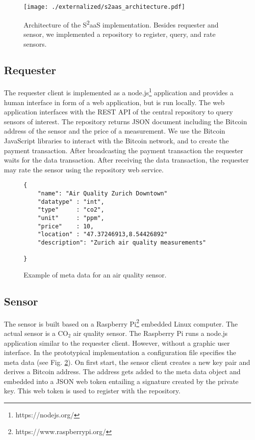 \begin{figure}
\centering
\texttt{[image: ./externalized/s2aas\_architecture.pdf]}
\caption{Architecture of the S\textsuperscript{2}aaS implementation. Besides requester and sensor, we implemented a repository to register, query, and rate sensors.}
\label{fig:s2aasImplementation}
\end{figure}



\subsection{Requester}

The requester client is implemented as a node.js\footnote{https://nodejs.org/} application and provides a human interface in form of a web application, but is run locally. The web application interfaces with the \ac{REST} \ac{API} of the central repository to query sensors of interest. The repository returns \ac{JSON} document including the Bitcoin address of the sensor and the price of a measurement. We use the Bitcoin JavaScript libraries to interact with the Bitcoin network, and to create the payment transaction. After broadcasting the payment transaction the requester waits for the data transaction. After receiving the data transaction, the requester may rate the sensor using the repository web service. 

\begin{figure}
\begin{lstlisting}[basicstyle=\ttfamily\small]
{     
    "name": "Air Quality Zurich Downtown"
    "datatype" : "int",
    "type"     : "co2",
    "unit"     : "ppm",
    "price"    : 10,
    "location" : "47.37246913,8.54426892"
    "description": "Zurich air quality measurements"

}
\end{lstlisting}
\label{lst:meta_data}
\caption{Example of meta data for an air quality sensor.}
\end{figure}


\subsection{Sensor}
\label{sec:s2aas_implement_sensor}

The sensor is built based on a Raspberry Pi\footnote{https://www.raspberrypi.org/} embedded Linux computer. The actual sensor is a CO${_2}$ air quality sensor. The Raspberry Pi runs a node.js application similar to the requester client. However, without a graphic user interface. In the prototypical implementation a configuration file specifies the meta data (see Fig. \ref{lst:meta_data}). On first start, the sensor client creates a new key pair and derives a Bitcoin address. The address gets added to the meta data object and embedded into a \ac{JSON} web token entailing a signature created by the private key. This web token is used to register with the repository.

